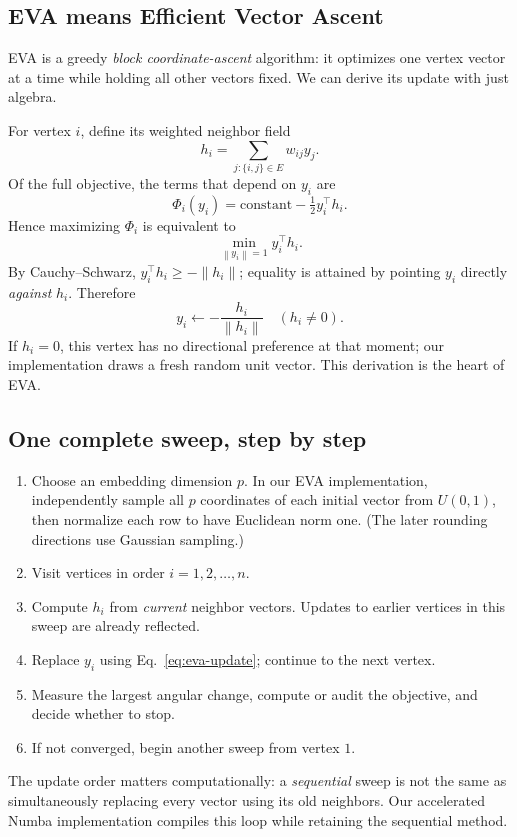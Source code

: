 \documentclass[10pt,letterpaper]{article}
\newcommand{\norm}[1]{\left\lVert#1\right\rVert}
\begin{document}
\subsection{EVA means Efficient Vector Ascent}
EVA is a greedy \emph{block coordinate-ascent} algorithm: it optimizes one vertex vector at a time while holding all other vectors fixed. We can derive its update with just algebra.

For vertex $i$, define its weighted neighbor field
\begin{equation}\label{eq:field}
 h_i=\sum_{j:\{i,j\}\in E}w_{ij}y_j.
\end{equation}
Of the full objective, the terms that depend on $y_i$ are
\begin{equation}\label{eq:local}
 \Phi_i(y_i)=\text{constant}-\tfrac12 y_i^\top h_i.
\end{equation}
Hence maximizing $\Phi_i$ is equivalent to
\begin{equation}\label{eq:local-min}
 \min_{\norm{y_i}=1}y_i^\top h_i.
\end{equation}
By Cauchy--Schwarz, $y_i^\top h_i\ge-\norm{h_i}$; equality is attained by pointing $y_i$ directly \emph{against} $h_i$. Therefore
\begin{equation}\label{eq:eva-update}
 \boxed{y_i\gets-\frac{h_i}{\norm{h_i}}\quad(h_i\ne0).}
\end{equation}
If $h_i=0$, this vertex has no directional preference at that moment; our implementation draws a fresh random unit vector. This derivation is the heart of EVA.

\subsection{One complete sweep, step by step}
\label{sec:evasweep}
\begin{enumerate}
\item Choose an embedding dimension $p$. In our EVA implementation, independently sample all $p$ coordinates of each initial vector from $U(0,1)$, then normalize each row to have Euclidean norm one. (The later rounding directions use Gaussian sampling.)
\item Visit vertices in order $i=1,2,\ldots,n$.
\item Compute $h_i$ from \emph{current} neighbor vectors. Updates to earlier vertices in this sweep are already reflected.
\item Replace $y_i$ using Eq.~\eqref{eq:eva-update}; continue to the next vertex.
\item Measure the largest angular change, compute or audit the objective, and decide whether to stop.
\item If not converged, begin another sweep from vertex $1$.
\end{enumerate}
The update order matters computationally: a \emph{sequential} sweep is not the same as simultaneously replacing every vector using its old neighbors. Our accelerated Numba implementation compiles this loop while retaining the sequential method.
\end{document}
